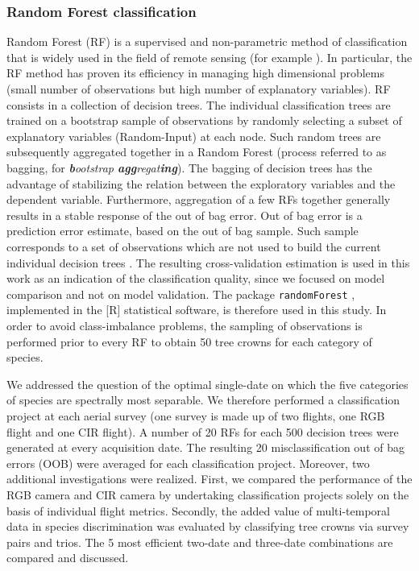 \documentclass[remotesensing,article,submit,moreauthors,pdftex,12pt,a4paper]{mdpi} %
\begin{document}
\subsubsection{Random Forest classification}

Random Forest (RF) is a supervised and non-parametric method of classification that is widely used in the field of remote sensing (for example \cite{stumpf_object-oriented_2011,burkholder_seasonal_2011,immitzer_tree_2012, zhu_continuous_2014}). 
In particular, the RF method has proven its efficiency in managing high dimensional problems \cite{genuer_variable_2010} (small number of observations but high number of explanatory variables). 
RF consists in a collection of decision trees. 
The individual classification trees are trained on a bootstrap sample of observations by randomly selecting a subset of explanatory variables (Random-Input) at each node. 
Such random trees are subsequently aggregated together in a Random Forest (process referred to as bagging, for \textit{\textbf{b}ootstrap \textbf{agg}regat\textbf{ing}}). 
The bagging of decision trees has the advantage of stabilizing the relation between the exploratory variables and the dependent variable. 
Furthermore, aggregation of a few RFs together generally results in a stable response of the out of bag error. 
Out of bag error is a prediction error estimate, based on the out of bag sample. Such sample corresponds to a set of observations which are not used to build the current individual decision trees \cite{genuer_variable_2010}. 
The resulting cross-validation estimation is used in this work as an indication of the classification quality, since we focused on model comparison and not on model validation. 
The package {\tt randomForest} \cite{liaw_classification_2002}, implemented in the [R] statistical software, is therefore used in this study. 
In order to avoid class-imbalance problems, the sampling of observations is performed prior to every RF to obtain 50 tree crowns for each category of species. 

We addressed the question of the optimal single-date on which the five categories of species are spectrally most separable. We therefore performed a classification project at each aerial survey (one survey is made up of two flights, one RGB flight and one CIR flight). 
A number of 20 RFs for each 500 decision trees were generated at every acquisition date.
The resulting 20 misclassification out of bag errors (OOB) were averaged for each classification project. 
Moreover, two additional investigations were realized. 
First, we compared the performance of the RGB camera and CIR camera by undertaking classification projects solely on the basis of individual flight metrics. 
Secondly, the added value of multi-temporal data in species discrimination was evaluated by classifying tree crowns via survey pairs and trios.
The 5 most efficient two-date and three-date combinations are compared and discussed.
\end{document}
